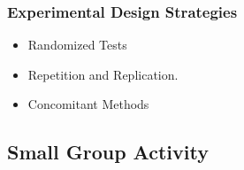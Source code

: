 \documentclass[fleqn]{beamer} %
\newcommand{\sectionIIIsubsectionIVtitle}{Experimental Design Strategies}
\newcommand{\sectionIIIsubsectionVtitle}{Small Group Activity}
\begin{document}
			\begin{frame}
				\frametitle{\sectionIIIsubsectionIVtitle}

				\begin{itemize}
					\item {\BL Randomized} Tests \vspccc%
					\item {\GR Repetition} and {\PR Replication}. \vspccc%
					\item {\BR Concomitant} Methods \vspccc
				\end{itemize}

			\end{frame}
	
		\subsection{\sectionIIIsubsectionVtitle}\label{sectionIIIsubsectionV}
\end{document}
